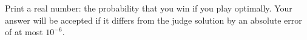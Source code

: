 
Print a real number: the probability that you win if you play optimally. Your answer will be accepted if it differs from the judge solution by an absolute error of at most $10^{-6}$.
